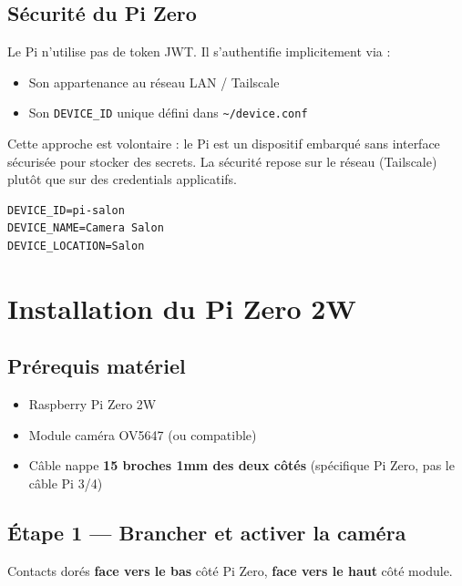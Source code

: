 \documentclass[12pt,a4paper]{article}
\begin{document}
\subsection{Sécurité du Pi Zero}

Le Pi n'utilise pas de token JWT. Il s'authentifie implicitement via :
\begin{itemize}
  \item Son appartenance au réseau LAN / Tailscale
  \item Son \texttt{DEVICE\_ID} unique défini dans \texttt{\textasciitilde/device.conf}
\end{itemize}

Cette approche est volontaire : le Pi est un dispositif embarqué sans interface sécurisée
pour stocker des secrets. La sécurité repose sur le réseau (Tailscale) plutôt que sur des
credentials applicatifs.

\begin{lstlisting}[caption={~/device.conf}]
DEVICE_ID=pi-salon
DEVICE_NAME=Camera Salon
DEVICE_LOCATION=Salon
\end{lstlisting}

\section{Installation du Pi Zero 2W}

\subsection{Prérequis matériel}

\begin{itemize}
  \item Raspberry Pi Zero 2W
  \item Module caméra OV5647 (ou compatible)
  \item Câble nappe \textbf{15 broches 1mm des deux côtés} (spécifique Pi Zero, pas le câble Pi 3/4)
\end{itemize}

\subsection{Étape 1 — Brancher et activer la caméra}

Contacts dorés \textbf{face vers le bas} côté Pi Zero, \textbf{face vers le haut} côté module.
\end{document}
